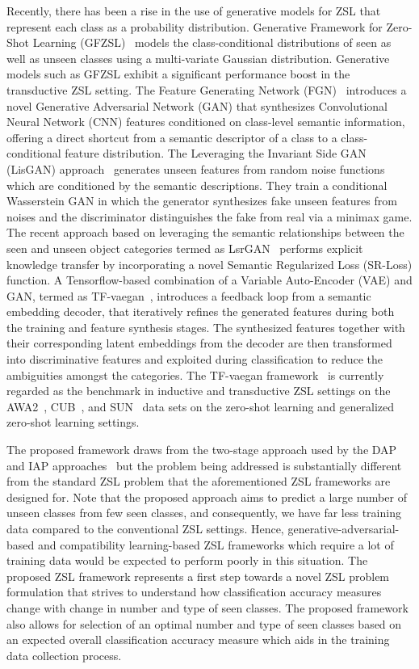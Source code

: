 Recently, there has been a rise in the use of generative models for ZSL that represent each class as a probability distribution. Generative Framework for Zero-Shot Learning (GFZSL)~\cite{gfzsl} models the class-conditional distributions of seen as well as unseen classes using a multi-variate Gaussian distribution. Generative models such as GFZSL exhibit a significant performance boost in the transductive ZSL setting. The Feature Generating Network (FGN)~\cite{fgn} introduces a novel Generative Adversarial Network (GAN) that synthesizes Convolutional Neural Network (CNN) features conditioned on class-level semantic information, offering a direct shortcut  from a semantic descriptor of a class to a class-conditional feature distribution. The Leveraging the Invariant Side GAN (LisGAN) approach~\cite{LISGAN} generates unseen features from random noise functions which are conditioned by the semantic descriptions. They train a conditional Wasserstein GAN in which the generator synthesizes fake unseen features from noises and the discriminator distinguishes the fake from real via a minimax game. The recent approach based on leveraging the semantic relationships between the seen and unseen object categories termed as LsrGAN~\cite{lsrGAN} performs explicit knowledge transfer by incorporating a novel Semantic Regularized Loss (SR-Loss) function. A Tensorflow-based combination of a Variable Auto-Encoder (VAE) and GAN, termed as TF-vaegan~\cite{tf-vegan}, introduces a feedback loop from a semantic embedding decoder, that iteratively refines the generated features during both the training and feature synthesis stages. The synthesized features together with their corresponding latent embeddings from the decoder are then transformed into discriminative features and exploited during classification to reduce the ambiguities amongst the categories. The TF-vaegan framework~\cite{tf-vegan} is currently regarded as the benchmark in inductive and transductive ZSL settings on the AWA2~\cite{awa}, CUB~\cite{cub}, and SUN~\cite{sun} data sets on the zero-shot learning and generalized zero-shot learning settings. 

\par
\medskip

The proposed framework draws from the two-stage approach used by the DAP and IAP approaches~\cite{DAP} but the problem being addressed is substantially different from the standard ZSL problem that the aforementioned ZSL frameworks are designed for. Note that the proposed approach aims to predict a large number of unseen classes from few seen classes, and consequently, we have far less training data compared to the conventional ZSL settings. Hence, generative-adversarial-based and compatibility learning-based ZSL frameworks which require a lot of training data would be expected to perform poorly in this situation. The proposed ZSL framework represents a first step towards a novel ZSL problem formulation that strives to understand how classification accuracy measures change with change in number and type of seen classes. The proposed framework also allows for selection of an optimal number and type of seen classes based on an expected overall classification accuracy measure which aids in the training data collection process.

\newpage